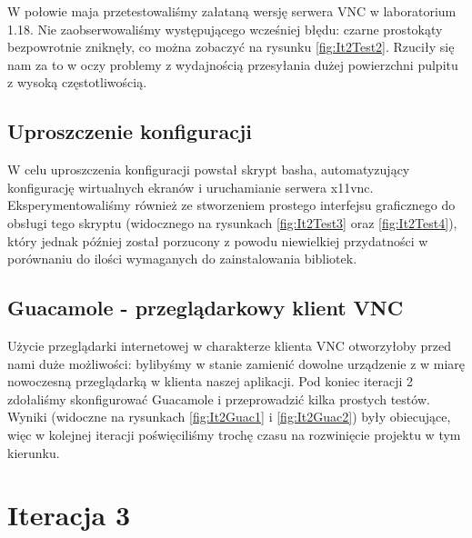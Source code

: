     \vfill
    \pagebreak
    W połowie maja przetestowaliśmy załataną wersję serwera VNC w laboratorium 1.18. Nie zaobserwowaliśmy występującego wcześniej błędu: czarne prostokąty bezpowrotnie zniknęły, co można zobaczyć na rysunku \ref{fig:It2Test2}. Rzuciły się nam za to w oczy problemy z wydajnością przesyłania dużej powierzchni pulpitu z wysoką częstotliwością.

  \subsection{Uproszczenie konfiguracji}

    W celu uproszczenia konfiguracji powstał skrypt basha, automatyzujący konfigurację wirtualnych ekranów i uruchamianie serwera x11vnc. Eksperymentowaliśmy również ze stworzeniem prostego interfejsu graficznego do obsługi tego skryptu (widocznego na rysunkach \ref{fig:It2Test3} oraz \ref{fig:It2Test4}), który jednak później został porzucony z powodu niewielkiej przydatności w porównaniu do ilości wymaganych do zainstalowania bibliotek.


  \subsection{Guacamole - przeglądarkowy klient VNC}

    Użycie przeglądarki internetowej w charakterze klienta VNC otworzyłoby przed nami duże możliwości: bylibyśmy w stanie zamienić dowolne urządzenie z w miarę nowoczesną przeglądarką w klienta naszej aplikacji. Pod koniec iteracji 2 zdołaliśmy skonfigurować Guacamole \cite{Guacamole} i przeprowadzić kilka prostych testów. Wyniki (widoczne na rysunkach \ref{fig:It2Guac1} i \ref{fig:It2Guac2}) były obiecujące, więc w kolejnej iteracji poświęciliśmy trochę czasu na rozwinięcie projektu w tym kierunku.

    \vfill
    \pagebreak

\section{Iteracja 3}

